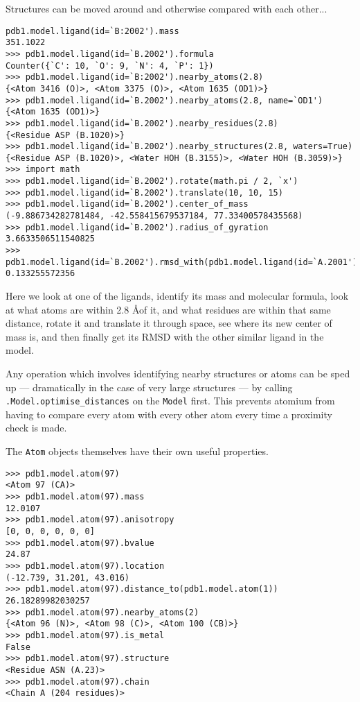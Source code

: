 Structures can be moved around and otherwise compared with each other...

\begin{footnotesize}
\begin{verbatim}
pdb1.model.ligand(id=`B:2002').mass
351.1022
>>> pdb1.model.ligand(id=`B.2002').formula
Counter({`C': 10, `O': 9, `N': 4, `P': 1})
>>> pdb1.model.ligand(id=`B:2002').nearby_atoms(2.8)
{<Atom 3416 (O)>, <Atom 3375 (O)>, <Atom 1635 (OD1)>}
>>> pdb1.model.ligand(id=`B.2002').nearby_atoms(2.8, name=`OD1')
{<Atom 1635 (OD1)>}
>>> pdb1.model.ligand(id=`B.2002').nearby_residues(2.8)
{<Residue ASP (B.1020)>}
>>> pdb1.model.ligand(id=`B.2002').nearby_structures(2.8, waters=True)
{<Residue ASP (B.1020)>, <Water HOH (B.3155)>, <Water HOH (B.3059)>}
>>> import math
>>> pdb1.model.ligand(id=`B.2002').rotate(math.pi / 2, `x')
>>> pdb1.model.ligand(id=`B.2002').translate(10, 10, 15)
>>> pdb1.model.ligand(id=`B.2002').center_of_mass
(-9.886734282781484, -42.558415679537184, 77.33400578435568)
>>> pdb1.model.ligand(id=`B.2002').radius_of_gyration
3.6633506511540825
>>> pdb1.model.ligand(id=`B.2002').rmsd_with(pdb1.model.ligand(id=`A.2001'))
0.133255572356
\end{verbatim}
\end{footnotesize}

Here we look at one of the ligands, identify its mass and molecular formula,
look at what atoms are within 2.8 \AA of it, and what residues are within
that same distance, rotate it and translate it through space, see where its new
center of mass is, and then finally get its RMSD with the other similar ligand
in the model.

Any operation which involves identifying nearby structures or atoms can be sped
up --- dramatically in the case of very large structures --- by calling
\texttt{.Model.optimise\_distances} on the \texttt{Model} first. This
prevents atomium from having to compare every atom with every other atom every
time a proximity check is made.

The \texttt{Atom} objects themselves have their own useful properties.

\begin{footnotesize}
\begin{verbatim}
>>> pdb1.model.atom(97)
<Atom 97 (CA)>
>>> pdb1.model.atom(97).mass
12.0107
>>> pdb1.model.atom(97).anisotropy
[0, 0, 0, 0, 0, 0]
>>> pdb1.model.atom(97).bvalue
24.87
>>> pdb1.model.atom(97).location
(-12.739, 31.201, 43.016)
>>> pdb1.model.atom(97).distance_to(pdb1.model.atom(1))
26.18289982030257
>>> pdb1.model.atom(97).nearby_atoms(2)
{<Atom 96 (N)>, <Atom 98 (C)>, <Atom 100 (CB)>}
>>> pdb1.model.atom(97).is_metal
False
>>> pdb1.model.atom(97).structure
<Residue ASN (A.23)>
>>> pdb1.model.atom(97).chain
<Chain A (204 residues)>
\end{verbatim}
\end{footnotesize}

